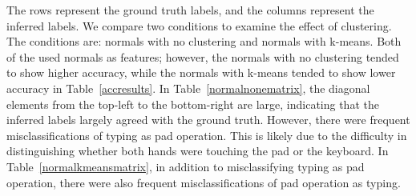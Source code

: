



%
The rows represent the ground truth labels, and the columns represent the inferred labels.
%
We compare two conditions to examine the effect of clustering.
  The conditions are: normals with no clustering and normals with k-means.
%
Both of the used normals as features; however, the normals with no clustering tended to show higher accuracy, while the normals with k-means tended to show lower accuracy in Table~\ref{accresults}.
%
In Table~\ref{normalnonematrix}, the diagonal elements from the top-left to the bottom-right are large, indicating that the inferred labels largely agreed with the ground truth. 
%
However, there were frequent misclassifications of typing as pad operation. 
%
This is likely due to the difficulty in distinguishing whether both hands were touching the pad or the keyboard. 
%
In Table~\ref{normalkmeansmatrix}, in addition to misclassifying typing as pad operation, there were also frequent misclassifications of pad operation as typing.
  
  
{
\renewcommand{\thesubtable}{\arabic{subtable}}

}